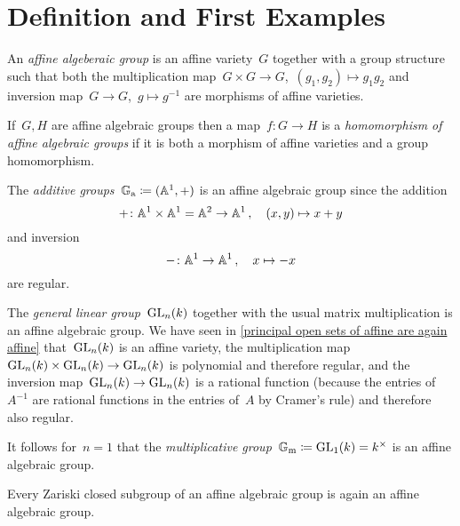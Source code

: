 \section{Definition and First Examples}


\begin{definition}
  An \emph{affine algeberaic group} is an affine variety~$G$ together with a group structure such that both the multiplication map~$G \times G \to G$,~$(g_1, g_2) \mapsto g_1 g_2$ and inversion map~$G \to G$,~$g \mapsto g^{-1}$ are morphisms of affine varieties.
  
  If~$G, H$ are affine algebraic groups then a map~$f \colon G \to H$ is a \emph{homomorphism of affine algebraic groups} if it is both a morphism of affine varieties and a group homomorphism.
\end{definition}


\begin{example}
  The \emph{additive groups}~$\mathbb{G}_{\text{a}} \coloneqq (\mathbb{A}^1, +)$ is an affine algebraic group since the addition
  \[
            {+}
    \colon  \mathbb{A}^1 \times \mathbb{A}^1
    =       \mathbb{A}^2
    \to     \mathbb{A}^1 \,,
    \quad   (x,y)
    \mapsto x+y
  \]
  and inversion
  \[
            {-}
    \colon  \mathbb{A}^1
    \to     \mathbb{A}^1 \,,
    \quad   x
    \mapsto -x
  \]
  are regular.
\end{example}


\begin{example}
  The \emph{general linear group}~$\operatorname{GL}_n(k)$ together with the usual matrix multiplication is an affine algebraic group.
  We have seen in \cref{principal open sets of affine are again affine} that~$\operatorname{GL}_n(k)$ is an affine variety, the multiplication map~$\operatorname{GL}_n(k) \times \operatorname{GL}_n(k) \to \operatorname{GL}_n(k)$ is polynomial and therefore regular, and the inversion map~$\operatorname{GL}_n(k) \to \operatorname{GL}_n(k)$ is a rational function (because the entries of~$A^{-1}$ are rational functions in the entries of~$A$ by Cramer’s rule) and therefore also regular.
  
  It follows for~$n = 1$ that the \emph{multiplicative group}~$\mathbb{G}_{\text{m}} \coloneqq \operatorname{GL}_1(k) = k^\times$ is an affine algebraic group.
\end{example}


\begin{lemma}
  Every Zariski closed subgroup of an affine algebraic group is again an affine algebraic group.
\end{lemma}


